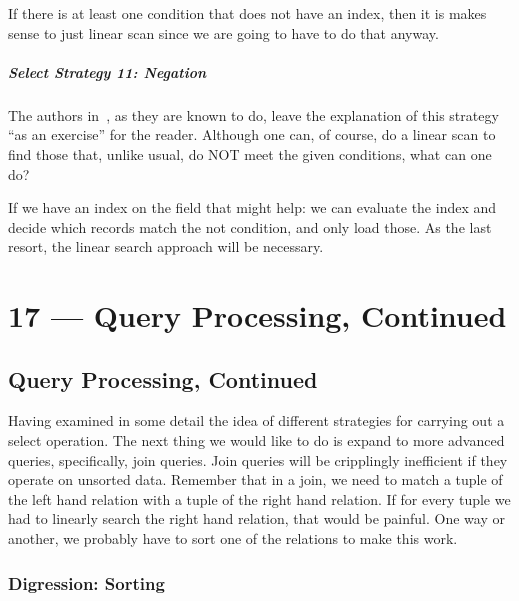 \documentclass[a4paper]{report}
\begin{document}
If there is at least one condition that does not have an index, then it is makes sense to just linear scan since we are going to have to do that anyway.

\paragraph{Select Strategy 11: Negation}
The authors in~\cite{dsc}, as they are known to do, leave the explanation of this strategy ``as an exercise'' for the reader.  Although one can, of course, do a linear scan to find those that, unlike usual, do NOT meet the given conditions, what can one do? 

If we have an index on the field that might help: we can evaluate the index and decide which records match the not condition, and only load those. As the last resort, the linear search approach will be necessary.











\chapter*{17 --- Query Processing, Continued}


\section*{Query Processing, Continued}

Having examined in some detail the idea of different strategies for carrying out a select operation. The next thing we would like to do is expand to more advanced queries, specifically, join queries. Join queries will be cripplingly inefficient if they operate on unsorted data. Remember that in a join, we need to match a tuple of the left hand relation with a tuple of the right hand relation. If for every tuple we had to linearly search the right hand relation, that would be painful. One way or another, we probably have to sort one of the relations to make this work.

\subsection*{Digression: Sorting}
\end{document}
